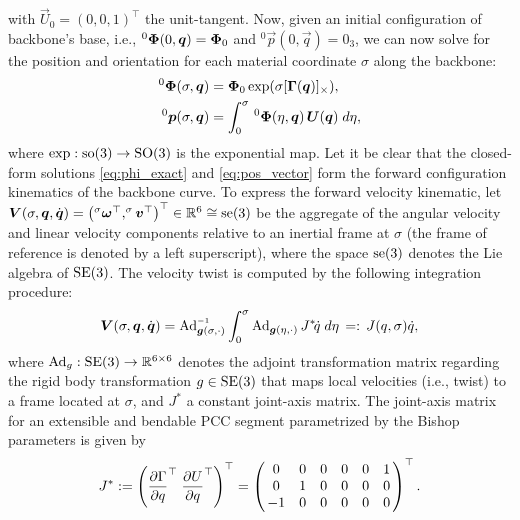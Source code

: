 {\begin{equation}
\end{equation}
%
with $\vec{U}_0 = (0,0,1)^\top$ the unit-tangent. Now, given an initial configuration of backbone's base, i.e., $^0 \boldsymbol{\Phi}(0,\boldsymbol{q}) = \boldsymbol{\Phi}_0$ and $^0 \vec{p}(0,\vec{q}) = 0_3$, we can now solve for the position and orientation for each material coordinate $\sigma$ along the backbone:
%
\begin{align}
^0\boldsymbol{\Phi}(\sigma,\boldsymbol{q}) & = \boldsymbol{\Phi}_0\exp(\sigma [\boldsymbol{\Gamma}(\boldsymbol{q})]_\times), \label{eq:phi_exact} \\
^0\boldsymbol{p}(\sigma,\boldsymbol{q}) & = \int_0^\sigma\,^0\boldsymbol{\Phi}(\eta,\boldsymbol{q})\, \boldsymbol{U}(\boldsymbol{q}) \; d\eta, \label{eq:pos_vector}
\end{align}
%
where $\exp: {\text{so}(3)} \to {\text{SO}(3)}$ is the exponential map. Let it be clear that the closed-form solutions \eqref{eq:phi_exact} and \eqref{eq:pos_vector} form the forward configuration kinematics of the backbone curve. To express the forward velocity kinematic, let  $\boldsymbol{V}(\sigma,\boldsymbol{q},\dot{\boldsymbol{q}}) = \left(^\sigma \boldsymbol{\omega}^\top,^\sigma \boldsymbol{v}^\top \right)^\top \in \mathbb{R}^6 \cong {\text{se}(3)}
$ be the aggregate of the angular velocity and linear velocity components relative to an inertial frame at $\sigma$ (the frame of reference is denoted by a left superscript), where the space ${\text{se}(3)}$ denotes the Lie algebra of ${\text{SE}(3)}$. The velocity twist is computed by the following integration procedure:
%
\begin{equation}
 \vec{V}(\sigma,\vec{q},\dot{\vec{q}}) = \Ad_{\mat{g}(\sigma,\cdot)}\inv \int_0^\sigma \Ad_{\mat{g}(\eta,\cdot)}\, J^*\! \dot{q}\;d\eta
 \,=:\, J(q,\sigma) \dot{q}, \label{eq:vel_cont}
\end{equation}
%
where $\text{Ad}_g: {\text{SE}(3)} \to \mathbb{R}^{6\times 6}$ denotes the adjoint transformation matrix regarding the rigid body transformation $g \in {\text{SE}(3)}$ that maps local velocities (i.e., twist) to a frame located at $\sigma$, and $J^*$ a constant joint-axis matrix. The joint-axis matrix for an extensible and bendable PCC segment parametrized by the Bishop parameters is given by
%
\begin{equation}
\renewcommand*{\arraystretch}{1}{}
J^* := \left(\dfrac{\p \Gamma}{\p q}^\top \; \dfrac{\p U}{\p q}^\top \right)^\top  = \begin{pmatrix}
\,0 & 0 & 0 & 0 & 0 & 1 \, \\
\,0 & 1 & 0 & 0 & 0 & 0 \,  \\
\,-1 & 0 & 0 & 0 & 0 & 0 \,  \\
\end{pmatrix}^\top. \label{eq:joint-axis-matrix}

\end{equation}}
